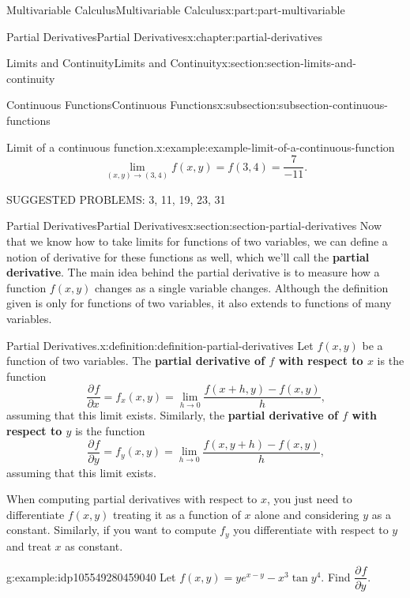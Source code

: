 \documentclass[twoside,10pt,]{book}
\newcommand{\terminology}[1]{\textbf{#1}}
\numberwithin{equation}{part}
\newcommand{\pdv}[3][]{\dfrac{\partial^{#1} #2}{\partial #3^{#1}}}
\begin{document}
\begin{partptx}{Multivariable Calculus}{}{Multivariable Calculus}{}{}{x:part:part-multivariable}
\begin{chapterptx}{Partial Derivatives}{}{Partial Derivatives}{}{}{x:chapter:partial-derivatives}
\begin{sectionptx}{Limits and Continuity}{}{Limits and Continuity}{}{}{x:section:section-limits-and-continuity}
\begin{subsectionptx}{Continuous Functions}{}{Continuous Functions}{}{}{x:subsection:subsection-continuous-functions}
\begin{example}{Limit of a continuous function.}{x:example:example-limit-of-a-continuous-function}
\begin{equation*}
\lim_{(x,y)\to(3,4)}f(x,y) = f(3,4) = \frac{7}{-11}.
\end{equation*}
%
\end{example}
\end{subsectionptx}
\begin{conclusion}{}%
SUGGESTED PROBLEMS: 3, 11, 19, 23, 31%
\end{conclusion}%
\end{sectionptx}
%
%
\typeout{************************************************}
\typeout{************************************************}
%
\begin{sectionptx}{Partial Derivatives}{}{Partial Derivatives}{}{}{x:section:section-partial-derivatives}
Now that we know how to take limits for functions of two variables, we can define a notion of derivative for these functions as well, which we'll call the \terminology{partial derivative}. The main idea behind the partial derivative is to measure how a function \(f(x,y)\) changes as a single variable changes. Although the definition given is only for functions of two variables, it also extends to functions of many variables.\begin{definition}{Partial Derivatives.}{x:definition:definition-partial-derivatives}%
%
Let \(f(x,y)\) be a function of two variables. The \terminology{partial derivative of \(f\) with respect to \(x\)} is the function%
\begin{equation*}
\pdv{f}{x} = f_{x}(x,y) = \lim_{h\to0}\frac{f(x+h,y)-f(x,y)}{h}\text{,}
\end{equation*}
assuming that this limit exists. Similarly, the \terminology{partial derivative of \(f\) with respect to \(y\)} is the function%
\begin{equation*}
\pdv{f}{y} = f_{y}(x,y) = \lim_{h\to0}\frac{f(x,y+h)-f(x,y)}{h}\text{,}
\end{equation*}
assuming that this limit exists.%
\end{definition}
When computing partial derivatives with respect to \(x\), you just need to differentiate \(f(x,y)\) treating it as a function of \(x\) alone and considering \(y\) as a constant. Similarly, if you want to compute \(f_{y}\) you differentiate with respect to \(y\) and treat \(x\) as constant.%
\begin{example}{}{g:example:idp105549280459040}%
Let \(f(x,y) = ye^{x-y} - x^{3}\tan y^{4}\). Find \(\pdv{f}{y}\).%
\par\smallskip%

\end{example}
\end{sectionptx}
\end{chapterptx}
\end{partptx}
\end{document}

